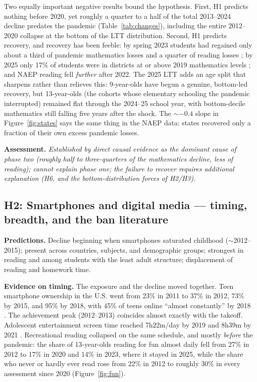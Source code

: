 \documentclass[11pt]{article}
\begin{document}
Two equally important negative results bound the hypothesis. First, H1 predicts nothing before 2020, yet roughly a quarter to a half of the total 2013--2024 decline predates the pandemic (Table~\ref{tab:changes}), including the entire 2012--2020 collapse at the bottom of the LTT distribution. Second, H1 predicts recovery, and recovery has been feeble: by spring 2023 students had regained only about a third of pandemic mathematics losses and a quarter of reading losses \citep{kane2024}; by 2025 only 17\% of students were in districts at or above 2019 mathematics levels \citep{kane2025}; and NAEP reading fell \emph{further} after 2022. The 2025 LTT adds an age split that sharpens rather than relieves this: 9-year-olds have begun a genuine, bottom-led recovery, but 13-year-olds (the cohorts whose elementary schooling the pandemic interrupted) remained flat through the 2024--25 school year, with bottom-decile mathematics still falling five years after the shock. The $\sim$$-0.4$ slope in Figure~\ref{fig:states} says the same thing in the NAEP data: states recovered only a fraction of their own excess pandemic losses.

\textbf{Assessment.} \emph{Established by direct causal evidence as the dominant cause of phase two (roughly half to three-quarters of the mathematics decline, less of reading); cannot explain phase one; the failure to recover requires additional explanation (H6, and the bottom-distribution forces of H2/H3).}

\subsection{H2: Smartphones and digital media --- timing, breadth, and the ban literature}
\label{sec:h2}

\textbf{Predictions.} Decline beginning when smartphones saturated childhood ($\sim$2012--2015); present across countries, subjects, and demographic groups; strongest in reading and among students with the least adult structure; displacement of reading and homework time.

\textbf{Evidence on timing.} The exposure and the decline moved together. Teen smartphone ownership in the U.S. went from 23\% in 2011 to 37\% in 2012, 73\% by 2015, and 95\% by 2018, with 45\% of teens online ``almost constantly'' by 2018 \citep{pew2013,pew2018}. The achievement peak (2012--2013) coincides almost exactly with the takeoff. Adolescent entertainment screen time reached 7h22m/day by 2019 and 8h39m by 2021 \citep{commonsense2021}. Recreational reading collapsed on the same schedule, and mostly \emph{before} the pandemic: the share of 13-year-olds reading for fun almost daily fell from 27\% in 2012 to 17\% in 2020 and 14\% in 2023, where it stayed in 2025, while the share who never or hardly ever read rose from 22\% in 2012 to roughly 30\% in every assessment since 2020 (Figure~\ref{fig:fun}).
\end{document}

